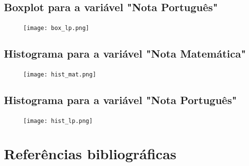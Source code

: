 \documentclass[17pt]{extarticle}
\begin{document}
\subsection{Boxplot para a variável "Nota Português"}
\begin{figure}[H]
    \texttt{[image: box\_lp.png]}
    \centering
\end{figure}

\subsection{Histograma para a variável "Nota Matemática"}
\begin{figure}[H]
    \texttt{[image: hist\_mat.png]}
    \centering
\end{figure}

\subsection{Histograma para a variável "Nota Português"}
\begin{figure}[H]
    \texttt{[image: hist\_lp.png]}
    \centering
\end{figure}

\newpage
\section{Referências bibliográficas}
\end{document}
